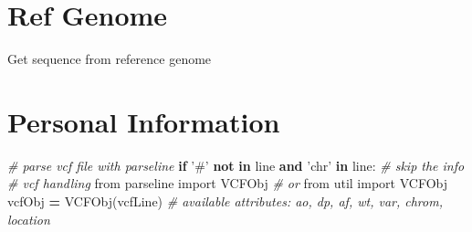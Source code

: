 \documentclass[]{book}
\newenvironment{Shaded}{\begin{snugshade}}{\end{snugshade}}
\newcommand{\KeywordTok}[1]{\textcolor[rgb]{0.13,0.29,0.53}{\textbf{#1}}}
\newcommand{\CharTok}[1]{\textcolor[rgb]{0.31,0.60,0.02}{#1}}
\newcommand{\SpecialCharTok}[1]{\textcolor[rgb]{0.00,0.00,0.00}{#1}}
\newcommand{\StringTok}[1]{\textcolor[rgb]{0.31,0.60,0.02}{#1}}
\newcommand{\ImportTok}[1]{#1}
\newcommand{\CommentTok}[1]{\textcolor[rgb]{0.56,0.35,0.01}{\textit{#1}}}
\newcommand{\VariableTok}[1]{\textcolor[rgb]{0.00,0.00,0.00}{#1}}
\newcommand{\ControlFlowTok}[1]{\textcolor[rgb]{0.13,0.29,0.53}{\textbf{#1}}}
\newcommand{\OperatorTok}[1]{\textcolor[rgb]{0.81,0.36,0.00}{\textbf{#1}}}
\newcommand{\NormalTok}[1]{#1}
\begin{document}
\section{Ref Genome}\label{ref-genome}

Get sequence from reference genome

\begin{Shaded}
\end{Shaded}

\section{Personal Information}\label{personal-information}

\begin{Shaded}
\begin{Highlighting}[]
\CommentTok{# parse vcf file with parseline}
\ControlFlowTok{if} \StringTok{'#'} \KeywordTok{not} \KeywordTok{in}\NormalTok{ line }\KeywordTok{and} \StringTok{'chr'} \KeywordTok{in}\NormalTok{ line: }\CommentTok{# skip the info}
\CommentTok{# vcf handling}
\ImportTok{from}\NormalTok{ parseline }\ImportTok{import}\NormalTok{ VCFObj}
\CommentTok{# or}
\ImportTok{from}\NormalTok{ util }\ImportTok{import}\NormalTok{ VCFObj}
\NormalTok{vcfObj }\OperatorTok{=}\NormalTok{ VCFObj(vcfLine)}
\CommentTok{# available attributes: ao, dp, af, wt, var, chrom, location}
\end{Highlighting}
\end{Shaded}
\end{document}
